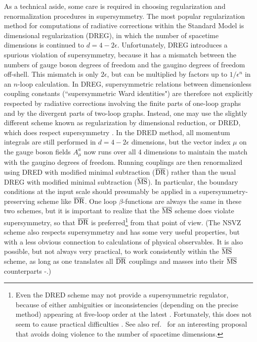 \documentclass[11pt]{article}
\def\drbar{\overline{\rm DR}}
\def\msbar{\overline{\rm MS}}
\begin{document}
As a technical aside, some care is required in choosing
regularization and renormalization procedures in supersymmetry.
The most popular regularization method for computations of radiative
corrections within the Standard Model is dimensional regularization
(DREG), in which the number of spacetime dimensions is continued to
$d=4-2\epsilon$. Unfortunately, DREG introduces a spurious violation of
supersymmetry, because it has a mismatch between the numbers of gauge
boson degrees of freedom and the gaugino degrees of freedom off-shell.
This mismatch is only $2\epsilon$, but can be multiplied by factors up to
$1/\epsilon^n$ in an $n$-loop calculation. In DREG, supersymmetric
relations between dimensionless coupling constants (``supersymmetric Ward
identities") are therefore not explicitly respected by radiative
corrections involving the finite parts of one-loop graphs and by the
divergent parts of two-loop graphs.  Instead, one may use the slightly
different scheme known as regularization by dimensional reduction, or
DRED, which does respect supersymmetry \cite{DRED}. In the DRED method,
all momentum integrals are still performed in $d=4-2\epsilon$ dimensions,
but the vector index $\mu$ on the gauge boson fields $A^a_\mu$ now runs
over all 4 dimensions to maintain the match with the gaugino degrees of
freedom. Running couplings are then renormalized using DRED with modified
minimal subtraction ($\drbar$) rather than the usual DREG with modified
minimal subtraction ($\msbar$). In particular, the boundary conditions at
the input scale should presumably be applied in a supersymmetry-preserving
scheme like $\drbar$.  One loop $\beta$-functions are always the same in
these two schemes, but it is important to realize that the $\msbar$ scheme
does violate supersymmetry, so that $\drbar$ is preferred\footnote{Even
the DRED scheme may not provide a supersymmetric regulator, because of
either ambiguities or inconsistencies (depending on the precise method)
appearing at five-loop order at the latest \cite{DREDdies}. Fortunately,
this does not seem to cause practical difficulties
\cite{JJperspective,Stockinger}. See also ref.~\cite{Woodard} for an 
interesting proposal that avoids doing violence to the number of spacetime
dimensions.} from that point of view. (The NSVZ scheme \cite{Shifman} also
respects supersymmetry and has some very useful properties, but with a
less obvious connection to calculations of physical observables. It is
also possible, but not always very practical, to work consistently within
the $\overline{\rm MS}$ scheme, as long as one translates all
$\overline{\rm DR}$ couplings and masses into their $\overline{\rm MS}$
counterparts 
\cite{mstodrone}-\cite{mstodrmore}.)
\end{document}
